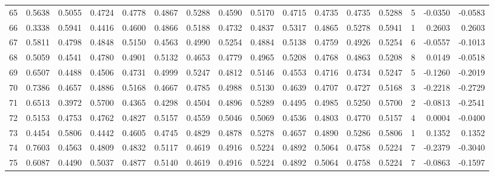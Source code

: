 \begin{tabular}{lrrrrrrrrrrrrrrr}
65  &      0.5638 &  0.5055 &  0.4724 &  0.4778 &  0.4867 &  0.5288 &  0.4590 &  0.5170 &  0.4715 &  0.4735 &   0.4735 &     0.5288 &      5 &                   -0.0350 &                    -0.0583 \\
66  &      0.3338 &  0.5941 &  0.4416 &  0.4600 &  0.4866 &  0.5188 &  0.4732 &  0.4837 &  0.5317 &  0.4865 &   0.5278 &     0.5941 &      1 &                    0.2603 &                     0.2603 \\
67  &      0.5811 &  0.4798 &  0.4848 &  0.5150 &  0.4563 &  0.4990 &  0.5254 &  0.4884 &  0.5138 &  0.4759 &   0.4926 &     0.5254 &      6 &                   -0.0557 &                    -0.1013 \\
68  &      0.5059 &  0.4541 &  0.4780 &  0.4901 &  0.5132 &  0.4653 &  0.4779 &  0.4965 &  0.5208 &  0.4768 &   0.4863 &     0.5208 &      8 &                    0.0149 &                    -0.0518 \\
69  &      0.6507 &  0.4488 &  0.4506 &  0.4731 &  0.4999 &  0.5247 &  0.4812 &  0.5146 &  0.4553 &  0.4716 &   0.4734 &     0.5247 &      5 &                   -0.1260 &                    -0.2019 \\
70  &      0.7386 &  0.4657 &  0.4886 &  0.5168 &  0.4667 &  0.4785 &  0.4988 &  0.5130 &  0.4639 &  0.4707 &   0.4727 &     0.5168 &      3 &                   -0.2218 &                    -0.2729 \\
71  &      0.6513 &  0.3972 &  0.5700 &  0.4365 &  0.4298 &  0.4504 &  0.4896 &  0.5289 &  0.4495 &  0.4985 &   0.5250 &     0.5700 &      2 &                   -0.0813 &                    -0.2541 \\
72  &      0.5153 &  0.4753 &  0.4762 &  0.4827 &  0.5157 &  0.4559 &  0.5046 &  0.5069 &  0.4536 &  0.4803 &   0.4770 &     0.5157 &      4 &                    0.0004 &                    -0.0400 \\
73  &      0.4454 &  0.5806 &  0.4442 &  0.4605 &  0.4745 &  0.4829 &  0.4878 &  0.5278 &  0.4657 &  0.4890 &   0.5286 &     0.5806 &      1 &                    0.1352 &                     0.1352 \\
74  &      0.7603 &  0.4563 &  0.4809 &  0.4832 &  0.5117 &  0.4619 &  0.4916 &  0.5224 &  0.4892 &  0.5064 &   0.4758 &     0.5224 &      7 &                   -0.2379 &                    -0.3040 \\
75  &      0.6087 &  0.4490 &  0.5037 &  0.4877 &  0.5140 &  0.4619 &  0.4916 &  0.5224 &  0.4892 &  0.5064 &   0.4758 &     0.5224 &      7 &                   -0.0863 &                    -0.1597 \\

\end{tabular}
